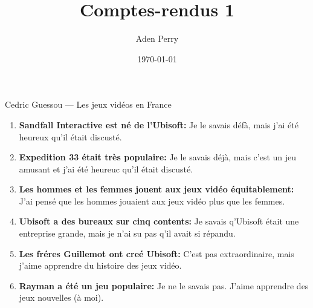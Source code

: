 \documentclass{article}
\title{Comptes-rendus 1}
\author{Aden Perry}
\date{\today}
\begin{document}
\maketitle

Cedric Guessou --- Les jeux vidéos en France

\begin{enumerate}
	\item \textbf{Sandfall Interactive est né de l'Ubisoft:} Je le savais défà,
	      mais j'ai été heureux qu'il était discusté.
	\item \textbf{Expedition 33 était très populaire:} Je le savais déjà,
	      mais c'est un jeu amusant et j'ai été heureuc qu'il était discusté.
	\item \textbf{Les hommes et les femmes jouent aux jeux vidéo équitablement:}
	      J'ai pensé que les hommes jouaient aux jeux vidéo plus que les femmes.
	\item \textbf{Ubisoft a des bureaux sur cinq contents:} Je savais q'Ubisoft
	      était une entreprise grande, mais je n'ai su pas q'il avait si
	      répandu.
	\item \textbf{Les fréres Guillemot ont creé Ubisoft:} C'est pas
	      extraordinaire, mais j'aime apprendre du histoire des jeux vidéo.
	\item \textbf{Rayman a été un jeu populaire:} Je ne le savais pas. J'aime
	      apprendre des jeux nouvelles (à moi).
\end{enumerate}
\end{document}
